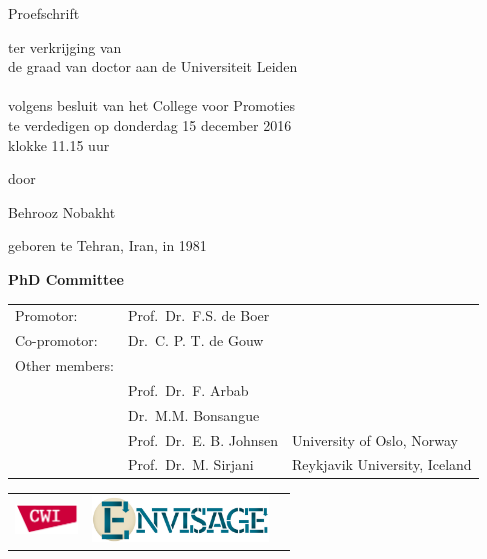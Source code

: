 \begin{titlepage}
\begin{center}
\par\vspace {2.1cm}
{\large \textsc Proefschrift}
\par\vspace {1.5cm}
{\large ter verkrijging van\\[.5cm]
de graad van doctor aan de Universiteit Leiden\\[.5cm]
\\[.5cm]
volgens besluit van het College voor Promoties\\[.5cm]
te verdedigen %
op donderdag 15 december 2016\\[.5cm]
klokke 11.15 uur \\[.5cm] }
\par\vspace {1cm} {\large door}
\par \vspace {.5cm} %
{\Large Behrooz Nobakht}    
\par%
{\large geboren te Tehran, Iran, in 1981} %
\end{center}
\clearpage
\noindent%
{\Large\textbf{PhD Committee}}\\[.5cm]

\begin{tabular}{lll}
Promotor:    & Prof.\ Dr.\ F.S. de Boer & \\
Co-promotor: & Dr.\ C. P. T. de Gouw & \\[12pt]
Other members:\\
& Prof.\ Dr.\ F. Arbab & \\
& Dr.\ M.M. Bonsangue & \\
& Prof.\ Dr.\ E. B. Johnsen & University of Oslo, Norway\\
& Prof.\ Dr.\ M. Sirjani & Reykjavik University, Iceland\\
\end{tabular}

\vfill
\vspace{5.5cm}

\hspace{-0.5cm}
\begin{tabular}{lll}
\includegraphics[height=0.8cm]{figs/cwi.png} &
\includegraphics[height=1.2cm]{figs/envisage-logo} &
\end{tabular}


\end{titlepage}
